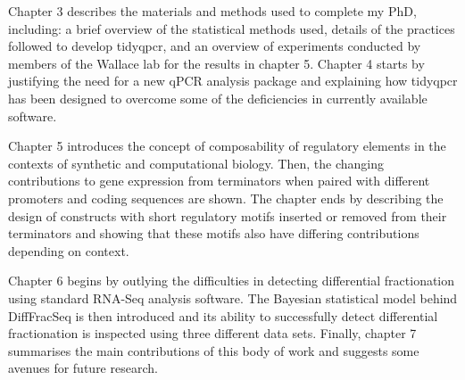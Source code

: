 \documentclass[../main.tex]{subfiles}
\begin{document}
Chapter 3 describes the materials and methods used to complete my PhD, including: a brief overview of the statistical methods used, details of the practices followed to develop tidyqpcr, and an overview of experiments conducted by members of the Wallace lab for the results in chapter 5. 
Chapter 4 starts by justifying the need for a new qPCR analysis package and explaining how tidyqpcr has been designed to overcome some of the deficiencies in currently available software.

Chapter 5 introduces the concept of composability of regulatory elements in the contexts of synthetic and computational biology.
Then, the changing contributions to gene expression from terminators when paired with different promoters and coding sequences are shown.
The chapter ends by describing the design of constructs with short regulatory motifs inserted or removed from their terminators and showing that these motifs also have differing contributions depending on context.

Chapter 6 begins by outlying the difficulties in detecting differential fractionation using standard RNA-Seq analysis software.
The Bayesian statistical model behind DiffFracSeq is then introduced and its ability to successfully detect differential fractionation is inspected using three different data sets.
Finally, chapter 7 summarises the main contributions of this body of work and suggests some avenues for future research. 

\newpage
\end{document}
